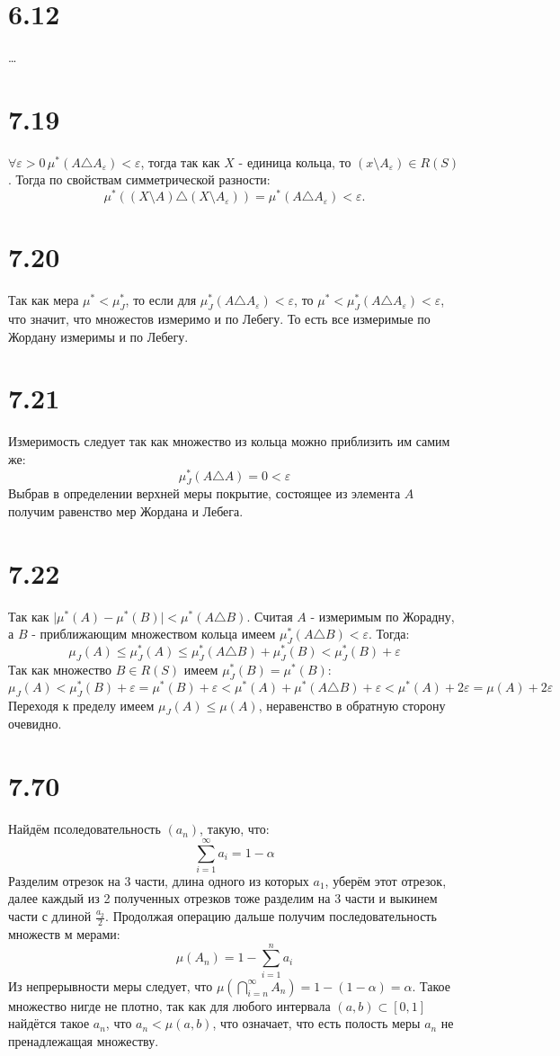 \documentclass[12pt]{article}
\begin{document}
\section{6.12}
\dots
\section{7.19}
$\forall \varepsilon > 0 \, \mu^{\ast} (A \triangle A_{\varepsilon}) < \varepsilon$, тогда так как $X$ - единица кольца, то
$(x \setminus A_{\varepsilon}) \in R(S)$. Тогда по свойствам симметрической разности:
\[
    \mu^{\ast}  ((X \setminus A) \triangle (X \setminus A_{\varepsilon} )) = \mu^{\ast}  (A \triangle A_{\varepsilon} )< \varepsilon.
\]
\section{7.20}
Так как мера $\mu^{\ast} < \mu_{J}^{\ast}$, то если для $\mu^{\ast}_J (A \triangle A_{\varepsilon}) < \varepsilon$, то 
$\mu^{\ast} < \mu^{\ast}_J (A \triangle A_{\varepsilon}) < \varepsilon$, что значит, что множестов измеримо и по Лебегу. То есть 
все измеримые по Жордану измеримы и по Лебегу.
\section{7.21}
Измеримость следует так как множество из кольца можно приблизить им самим же: 
\[
    \mu^{\ast}_J (A \triangle A) = 0 < \varepsilon
\]
Выбрав в определении верхней меры покрытие, состоящее из элемента $A$ получим равенство мер Жордана и Лебега. 
\section{7.22}
Так как $\vert \mu^{\ast}(A) - \mu^{\ast}(B) \vert < \mu^{\ast} (A \triangle B)$. Считая $A$ - измеримым по Жорадну, 
а $B$ - приближающим множеством кольца имеем $\mu^{\ast}_J (A \triangle B) < \varepsilon$. Тогда:
\[
    \mu_J(A) \leq \mu^{\ast}_J(A) \leq \mu^{\ast}_J (A \triangle B) + \mu^{\ast}_J(B) < \mu^{\ast}_J(B) + \varepsilon
\]
Так как множество $B \in R(S)$ имеем $\mu^{\ast}_J(B) = \mu^{\ast}(B)$:
\[
    \mu_J(A) < \mu^{\ast}_J(B) + \varepsilon = \mu^{\ast}(B) + \varepsilon < \mu^{\ast}(A) + \mu^{\ast} (A \triangle B) + \varepsilon < 
    \mu^{\ast}(A) + 2\varepsilon = \mu(A) + 2\varepsilon
\] 
Переходя к пределу имеем $\mu_J(A) \leq \mu(A)$, неравенство в обратную сторону очевидно. 
\section{7.70}
Найдём псоледовательность $(a_n)$, такую, что: 
\[
    \sum_{i=1}^{\infty} a_i = 1 - \alpha
\] 
Разделим отрезок на 3 части, длина одного из которых $a_1$, уберём этот отрезок, далее каждый из 2 полученных отрезков тоже разделим на 
3 части и выкинем части с длиной $\frac{a_2}{2}$. Продолжая операцию дальше получим последовательность множеств м мерами: 
\[
    \mu(A_n) = 1 - \sum_{i=1}^{n} a_i 
\]  
Из непрерывности меры следует, что $\mu (\bigcap_{i=n}^{\infty} A_n) = 1 - ( 1 - \alpha) = \alpha$. Такое множество нигде не плотно, так 
как для любого интервала $(a, b) \subset [0, 1]$ найдётся такое $a_n$, что $a_n < \mu (a, b)$, что означает, что 
есть полость меры $a_n$ не пренадлежащая множеству.      
\end{document}

